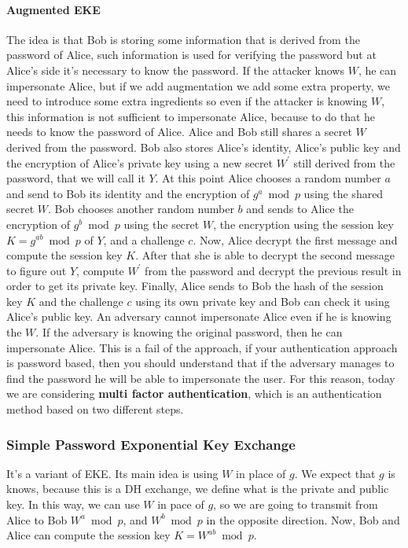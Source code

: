 \documentclass[11pt]{article}
\begin{document}
\paragraph{Augmented EKE} The idea is that Bob is storing some information that is derived from the password of Alice, such information is used for verifying the password but at Alice's side it's necessary to know the password. If the attacker knows $W$, he can impersonate Alice, but if we add augmentation we add some extra property, we need to introduce some extra ingredients so even if the attacker is knowing $W$, this information is not sufficient to impersonate Alice, because to do that he needs to know the password of Alice. Alice and Bob still shares a secret $W$ derived from the password. Bob also stores Alice's identity, Alice's public key and the encryption of Alice's private key using a new secret $W^{'}$ still derived from the password, that we will call it $Y$. At this point Alice chooses a random number $a$ and send to Bob its identity and the encryption of $g^a \bmod p$ using the shared secret $W$. Bob chooses another random number $b$ and sends to Alice the encryption of $g^b \bmod p$ using the secret $W$, the encryption using the session key $K = g^{ab} \bmod p$ of $Y$, and a challenge $c$. Now, Alice decrypt the first message and compute the session key $K$. After that she is able to decrypt the second message to figure out $Y$, compute $W^{'}$ from the password and decrypt the previous result in order to get its private key. Finally, Alice sends to Bob the hash of the session key $K$ and the challenge $c$ using its own private key and Bob can check it using Alice's public key. An adversary cannot impersonate Alice even if he is knowing the $W$. If the adversary is knowing the original password, then he can impersonate Alice. This is a fail of the approach, if your authentication approach is password based, then you should understand that if the adversary manages to find the password he will be able to impersonate the user. For this reason, today we are considering \textbf{multi factor authentication}, which is an authentication method based on two different steps.
\subsubsection{Simple Password Exponential Key Exchange}
It's a variant of EKE. Its main idea is using $W$ in place of $g$. We expect that $g$ is knows, because this is a DH exchange, we define what is the private and public key. In this way, we can use $W$ in pace of $g$, so we are going to transmit from Alice to Bob $W^a \bmod p$, and $W^b \bmod p$ in the opposite direction. Now, Bob and Alice can compute the session key $K = W^{ab} \bmod p$.
\end{document}

